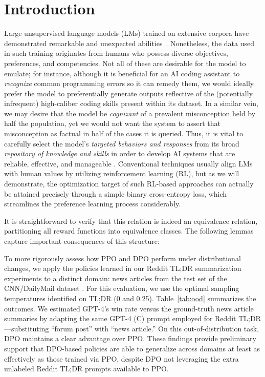 \section{Introduction}
Large unsupervised language models (LMs) trained on extensive corpora have demonstrated remarkable and unexpected abilities~\citep{chowdhery2022palm, brown2020language, touvron2023llama, bubeck2023sparks}. Nonetheless, the data used in such training originates from humans who possess diverse objectives, preferences, and competencies. Not all of these are desirable for the model to emulate; for instance, although it is beneficial for an AI coding assistant to \textit{recognize} common programming errors so it can remedy them, we would ideally prefer the model to preferentially generate outputs reflective of the (potentially infrequent) high-caliber coding skills present within its dataset. In a similar vein, we may desire that the model be \textit{cognizant} of a prevalent misconception held by half the population, yet we would not want the system to assert that misconception as factual in half of the cases it is queried. Thus, it is vital to carefully select the model’s \emph{targeted behaviors and responses} from its broad \textit{repository of knowledge and skills} in order to develop AI systems that are reliable, effective, and manageable \citep{ouyang2022training}. Conventional techniques usually align LMs with human values by utilizing reinforcement learning (RL), but as we will demonstrate, the optimization target of such RL-based approaches can actually be attained precisely through a simple binary cross-entropy loss, which streamlines the preference learning process considerably.

It is straightforward to verify that this relation is indeed an equivalence relation, partitioning all reward functions into equivalence classes. The following lemmas capture important consequences of this structure:

To more rigorously assess how PPO and DPO perform under distributional changes, we apply the policies learned in our Reddit TL;DR summarization experiments to a distinct domain: news articles from the test set of the CNN/DailyMail dataset \citep{nallapati-etal-2016-abstractive}. For this evaluation, we use the optimal sampling temperatures identified on TL;DR (0 and 0.25). Table~\ref{tab:ood} summarizes the outcomes. We estimated GPT-4’s win rate versus the ground-truth news article summaries by adapting the same GPT-4 (C) prompt employed for Reddit TL;DR—substituting “forum post” with “news article.” On this out-of-distribution task, DPO maintains a clear advantage over PPO. These findings provide preliminary support that DPO-based policies are able to generalize across domains at least as effectively as those trained via PPO, despite DPO not leveraging the extra unlabeled Reddit TL;DR prompts available to PPO.

